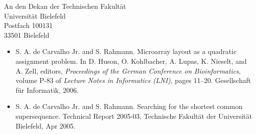 \documentclass[a4paper,11pt]{letter}
\begin{document}
\begin{letter}{
  An den Dekan der Technischen Fakult\"at\\
  Universit\"at Bielefeld\\
  Postfach 100131\\
  33501 Bielefeld
}
\begin{itemize}
\item S. A. de Carvalho Jr. and S. Rahmann. Microarray layout as a quadratic
assignment problem. In D. Huson, O. Kohlbacher, A. Lupas, K. Nieselt, and A.
Zell, editors, \emph{Proceedings of the German Conference on Bioinformatics},
volume P-83 of \emph{Lecture Notes in Informatics (LNI)}, pages 11--20.
Gesellschaft f\"ur Informatik, 2006.

\item S. A. de Carvalho Jr. and S. Rahmann. Searching for the shortest common
supersequence. Technical Report 2005-03, Technische Fakult\"at der Universit\"at
Bielefeld, Apr 2005.
\end{itemize}

\end{letter}
\end{document}

